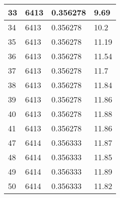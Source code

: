 \begin{table}
\begin{longtable}{ | l | l | l | l |}
    33 & 6413 & 0.356278 & 9.69 \\ \hline
    34 & 6413 & 0.356278 & 10.2 \\ \hline
    35 & 6413 & 0.356278 & 11.19 \\ \hline
    36 & 6413 & 0.356278 & 11.54 \\ \hline
    37 & 6413 & 0.356278 & 11.7 \\ \hline
    38 & 6413 & 0.356278 & 11.84 \\ \hline
    39 & 6413 & 0.356278 & 11.86 \\ \hline
    40 & 6413 & 0.356278 & 11.88 \\ \hline
    41 & 6413 & 0.356278 & 11.86 \\ \hline
    47 & 6414 & 0.356333 & 11.87 \\ \hline
    48 & 6414 & 0.356333 & 11.85 \\ \hline
    49 & 6414 & 0.356333 & 11.89 \\ \hline
    50 & 6414 & 0.356333 & 11.82 \\ \hline
    \end{longtable}
\label{table:GPU result}
\end{table}
\bigskip

